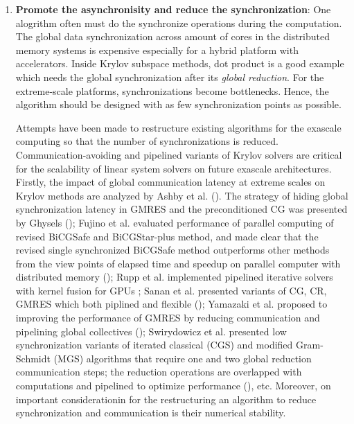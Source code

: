 \begin{enumerate}
	\item \textbf{Promote the asynchronisity and reduce the synchronization}: One alogrithm often must do the synchronize operations during the computation. The global data synchronization across amount of cores in the distributed memory systems is expensive especially for a hybrid platform with accelerators. Inside Krylov subspace methods, dot product is a good example which needs the global synchronization after its \textit{global reduction}. For the extreme-scale platforms, synchronizations become bottlenecks. Hence, the algorithm should be designed with as few synchronization points as possible.
	
	Attempts have been made to restructure existing algorithms for the exascale computing so that the number of synchronizations is reduced. Communication-avoiding and pipelined variants of Krylov solvers are critical for the scalability of linear system solvers on future exascale architectures. Firstly, the impact of global communication latency at extreme scales on Krylov methods are analyzed by Ashby et al. (\cite{ashby2012impact}). The strategy of hiding global synchronization latency in GMRES and the preconditioned CG was presented by Ghysels (\cite{ghysels2013hiding,ghysels2014hiding}); Fujino et al. evaluated performance of parallel computing of revised BiCGSafe and BiCGStar-plus method, and made clear that the revised single synchronized BiCGSafe method outperforms other methods from the view points of elapsed time and speedup on parallel computer with distributed memory (\cite{fujino2015estimation}); Rupp et al. implemented pipelined iterative solvers with kernel fusion for GPUs \cite{rupp2016pipelined}; Sanan et al. presented variants of CG, CR, GMRES which both piplined and flexible (\cite{sanan2016pipelined}); Yamazaki et al. proposed to improving the performance of GMRES by reducing communication and pipelining global collectives (\cite{yamazaki2017improving}); Swirydowicz et al. presented low synchronization variants of iterated classical (CGS) and modified Gram-Schmidt (MGS) algorithms that require one and two global reduction communication steps; the reduction operations are overlapped with computations and pipelined to optimize performance (\cite{swirydowicz2018low}), etc. Moreover, on important considerationin for the restructuring an algorithm to reduce synchronization and communication is their numerical stability.
	

\end{enumerate}
